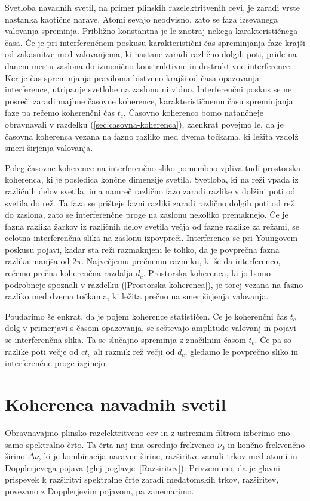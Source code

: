 Svetloba navadnih svetil, na primer plinskih razelektritvenih cevi, 
je zaradi vrste nastanka kaotične narave. 
Atomi sevajo neodvisno, zato se faza izsevanega valovanja
spreminja. Približno konstantna je le znotraj nekega karakterističnega
časa. Če je pri interferenčnem poskusu karakteristični čas spreminjanja
faze krajši od zakasnitve med valovanjema, ki nastane zaradi različno
dolgih poti, pride na danem mestu zaslona do izmenično konstruktivne in 
destruktivne interference. Ker je čas spreminjanja praviloma
bistveno krajši od časa opazovanja interference,
utripanje svetlobe na zaslonu ni vidno. Interferenčni poskus se ne 
posreči zaradi majhne časovne koherence,
karakterističnemu času spreminjanja faze pa rečemo 
koherenčni čas
$t_{c}$. Časovno koherenco bomo natančneje obravnavali v razdelku
(\ref{sec:casovna-koherenca}), zaenkrat povejmo le, da je časovna
koherenca vezana na fazno razliko med dvema točkama, ki ležita
vzdolž smeri širjenja valovanja. 

Poleg časovne koherence na interferenčno sliko pomembno vpliva tudi
prostorska koherenca, ki je posledica
končne dimenzije svetila. Svetloba, ki na reži vpada iz različnih delov
svetila, ima namreč različno fazo zaradi razlike v dolžini poti od
svetila do rež. Ta faza se prišteje fazni razliki zaradi različno dolgih poti 
od rež do zaslona, zato se interferenčne proge na zaslonu nekoliko 
premaknejo. Če je fazna razlika žarkov iz različnih
delov svetila večja od fazne razlike za režami, se celotna interferenčna
slika na zaslonu izpovpreči. Interferenca se pri Youngovem poskusu
pojavi, kadar sta reži razmaknjeni le toliko, da je povprečna fazna
razlika manjša od $2\pi$. Največjemu prečnemu razmiku, ki še da interferenco,
rečemo prečna koherenčna razdalja $d_{c}$. 
Prostorska koherenca, ki jo bomo podrobneje spoznali v razdelku 
(\ref{Prostorska-koherenca}),
je torej vezana na fazno razliko med dvema točkama, ki ležita prečno 
na smer širjenja valovanja.

Poudarimo še enkrat, da je pojem koherence statističen.
Če je koherenčni čas $t_{c}$ dolg v primerjavi s časom opazovanja,
se seštevajo amplitude valovanj in pojavi se interferenčna slika.
Ta se slučajno spreminja z značilnim časom $t_{c}$. Če pa so razlike
poti večje od $ct_{c}$ ali razmik rež večji od $d_{c}$, gledamo
le povprečno sliko in interferenčne proge izginejo.

\section{Koherenca navadnih svetil}
\label{chap:kns}
Obravnavajmo plinsko razelektritveno cev in z
ustreznim filtrom izberimo eno samo spektralno črto. Ta črta naj ima
osrednjo frekvenco $\nu_{0}$ in končno frekvenčno širino $\Delta\nu$,
ki je kombinacija naravne širine, razširitve zaradi trkov med atomi in 
Dopplerjevega pojava (glej poglavje~\ref{Razsiritev}). Privzemimo,
da je glavni prispevek k razširitvi spektralne črte zaradi med\-atomskih
trkov, razširitev, povezano z Dopplerjevim pojavom, pa zanemarimo.

